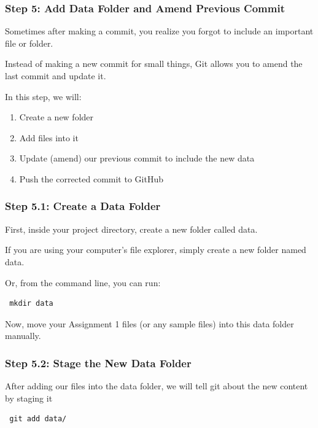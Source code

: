 \documentclass[
  11pt,
  a4paper,
]{article}
\begin{document}
\newpage

\subsubsection{Step 5: Add Data Folder and Amend Previous
Commit}\label{step-5-add-data-folder-and-amend-previous-commit}

Sometimes after making a commit, you realize you forgot to include an
important file or folder.

Instead of making a new commit for small things, Git allows you to amend
the last commit and update it.

In this step, we will:

\begin{enumerate}
\def\labelenumi{\arabic{enumi}.}
\item
  Create a new folder
\item
  Add files into it
\item
  Update (amend) our previous commit to include the new data
\item
  Push the corrected commit to GitHub
\end{enumerate}

\subsubsection{Step 5.1: Create a Data
Folder}\label{step-5.1-create-a-data-folder}

First, inside your project directory, create a new folder called data.

If you are using your computer's file explorer, simply create a new
folder named data.

Or, from the command line, you can run:

\begin{verbatim}
 mkdir data
\end{verbatim}

Now, move your Assignment 1 files (or any sample files) into this data
folder manually.

\subsubsection{Step 5.2: Stage the New Data
Folder}\label{step-5.2-stage-the-new-data-folder}

After adding our files into the data folder, we will tell git about the
new content by staging it

\begin{verbatim}
 git add data/
\end{verbatim}
\end{document}

